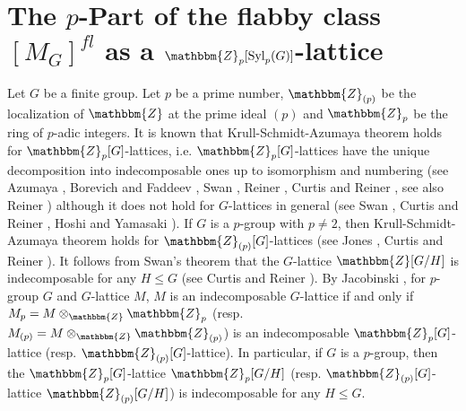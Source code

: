 \documentclass{amsart}
\theoremstyle{plain}
\theoremstyle{definition}
\theoremstyle{remark}
\newcommand{\bZ}{\mathbbm{Z}}\newcommand{\bQ}{\mathbbm{Q}}
\newcommand{\Syl}{{\rm Syl}}
\begin{document}
\section{The $p$-Part of the flabby class $[M_G]^{fl}$ as a $\bZ_p[\Syl_p(G)]$-lattice}\label{S7}

Let $G$ be a finite group. 
Let $p$ be a prime number, 
$\bZ_{(p)}$ be the localization of $\bZ$ at the prime ideal $(p)$ 
and $\bZ_p$ be the ring of $p$-adic integers. 
It is known that 
Krull-Schmidt-Azumaya theorem holds for $\bZ_p[G]$-lattices, 
i.e. $\bZ_p[G]$-lattices have the unique decomposition into 
indecomposable ones up to isomorphism and numbering 
(see Azumaya \cite[Theorem 1]{Azu50}, Borevich and Faddeev \cite{BF59}, 
Swan \cite[Proposition 6.1 and Remark]{Swa60}, 
Reiner \cite[Theorem 1]{Rei61}, 
Curtis and Reiner \cite[Theorem 6.12]{CR81}, 
see also Reiner \cite[Section 5]{Rei70}) 
although it does not hold for $G$-lattices in general 
(see Swan \cite[Section 10]{Swa60}, Curtis and Reiner \cite[Section 36]{CR81}, 
Hoshi and Yamasaki \cite[page 9 and Chapter 4]{HY17}). 
If $G$ is a $p$-group with $p\neq 2$, then 
Krull-Schmidt-Azumaya theorem holds for $\bZ_{(p)}[G]$-lattices 
(see Jones \cite[{Theorem 2 with $q=1$}]{Jon65}, 
Curtis and Reiner \cite[Theorem 36.1]{CR81}). 
It follows from Swan's theorem \cite[Theorem 8.1]{Swa60} that 
the $G$-lattice 
$\bZ[G/H]$ is indecomposable for any $H\leq G$ 
(see Curtis and Reiner \cite[Theorem 32.14]{CR81}). 
By Jacobinski \cite[Theorem 3.3 and Corollary 3.5]{Jac68}, 
for $p$-group $G$ and $G$-lattice $M$, 
$M$ is an indecomposable $G$-lattice 
if and only if 
$M_p=M\otimes_\bZ\bZ_p$ (resp. $M_{(p)}=M\otimes_\bZ\bZ_{(p)}$) 
is an indecomposable $\bZ_p[G]$-lattice (resp. $\bZ_{(p)}[G]$-lattice). 
In particular, if $G$ is a $p$-group, then 
the $\bZ_p[G]$-lattice $\bZ_p[G/H]$ 
(resp. $\bZ_{(p)}[G]$-lattice $\bZ_{(p)}[G/H]$) 
is indecomposable for any $H\leq G$. 
\end{document}
